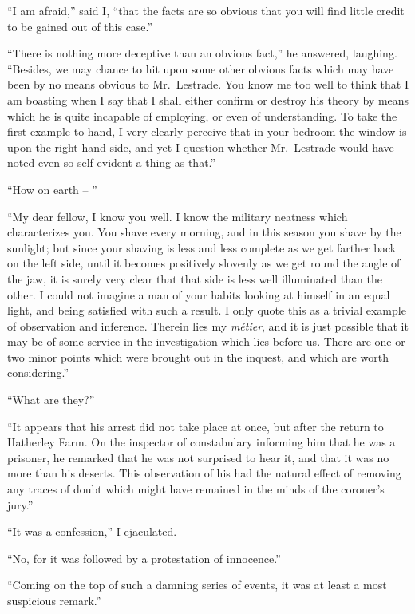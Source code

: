 “I am afraid,” said I, “that the facts are so obvious that
you will find little credit to be gained out of this case.”

“There is nothing more deceptive than an obvious fact,” he
answered, laughing. “Besides, we may chance to hit upon
some other obvious facts which may have been by no means
obvious to Mr.~Lestrade. You know me too well to think that
I am boasting when I say that I shall either confirm or destroy
his theory by means which he is quite incapable of employing,
or even of understanding. To take the first example
to hand, I very clearly perceive that in your bedroom the window
is upon the right-hand side, and yet I question whether
Mr.~Lestrade would have noted even so self-evident a thing
as that.”

“How on earth -- ”

“My dear fellow, I know you well. I know the military
neatness which characterizes you. You shave every morning,
and in this season you shave by the sunlight; but since your
shaving is less and less complete as we get farther back on
the left side, until it becomes positively slovenly as we get
round the angle of the jaw, it is surely very clear that that side
is less well illuminated than the other. I could not imagine
a man of your habits looking at himself in an equal light, and
being satisfied with such a result. I only quote this as a
trivial example of observation and inference. Therein lies my
\textit{métier}, and it is just possible that it may be of some service in
the investigation which lies before us. There are one or two
minor points which were brought out in the inquest, and which
are worth considering.”

“What are they?”

“It appears that his arrest did not take place at once, but
after the return to Hatherley Farm. On the inspector of
constabulary informing him that he was a prisoner, he remarked
that he was not surprised to hear it, and that it was no more
than his deserts. This observation of his had the natural
effect of removing any traces of doubt which might have remained
in the minds of the coroner’s jury.”

“It was a confession,” I ejaculated.

“No, for it was followed by a protestation of innocence.”

“Coming on the top of such a damning series of events, it
was at least a most suspicious remark.”

